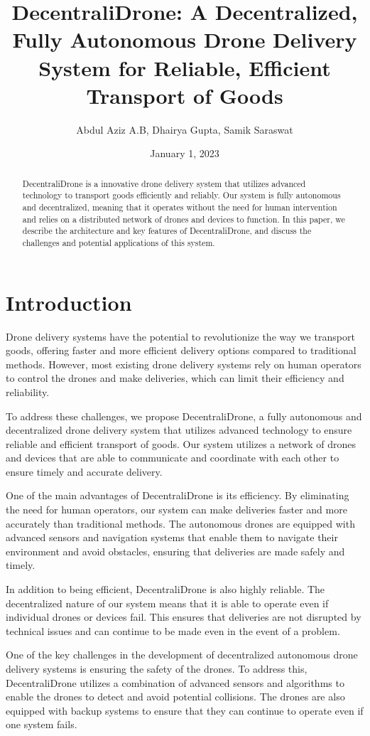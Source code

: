 \documentclass[conference]{IEEEtran}
\title{DecentraliDrone: A Decentralized, Fully Autonomous Drone Delivery System for Reliable, Efficient Transport of Goods}
\author{Abdul Aziz A.B, Dhairya Gupta, Samik Saraswat}
\date{January 1, 2023}
\begin{document}
\maketitle

\begin{abstract}
DecentraliDrone is a innovative drone delivery system that utilizes advanced technology to transport goods efficiently and reliably. Our system is fully autonomous and decentralized, meaning that it operates without the need for human intervention and relies on a distributed network of drones and devices to function. In this paper, we describe the architecture and key features of DecentraliDrone, and discuss the challenges and potential applications of this system.
\end{abstract}

\section{Introduction}
Drone delivery systems have the potential to revolutionize the way we transport goods, offering faster and more efficient delivery options compared to traditional methods. However, most existing drone delivery systems rely on human operators to control the drones and make deliveries, which can limit their efficiency and reliability.

To address these challenges, we propose DecentraliDrone, a fully autonomous and decentralized drone delivery system that utilizes advanced technology to ensure reliable and efficient transport of goods. Our system utilizes a network of drones and devices that are able to communicate and coordinate with each other to ensure timely and accurate delivery.

One of the main advantages of DecentraliDrone is its efficiency. By eliminating the need for human operators, our system can make deliveries faster and more accurately than traditional methods. The autonomous drones are equipped with advanced sensors and navigation systems that enable them to navigate their environment and avoid obstacles, ensuring that deliveries are made safely and timely.

In addition to being efficient, DecentraliDrone is also highly reliable. The decentralized nature of our system means that it is able to operate even if individual drones or devices fail. This ensures that deliveries are not disrupted by technical issues and can continue to be made even in the event of a problem.

One of the key challenges in the development of decentralized autonomous drone delivery systems is ensuring the safety of the drones. To address this, DecentraliDrone utilizes a combination of advanced sensors and algorithms to enable the drones to detect and avoid potential collisions. The drones are also equipped with backup systems to ensure that they can continue to operate even if one system fails.
\end{document}
